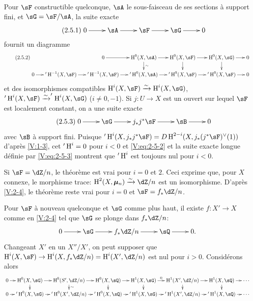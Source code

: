 Pour $\sF$ constructible quelconque, $\sA$ le sous-faisceau de ses sections \`a 
support fini, et $\sG=\sF/\sA$, la suite exacte 
\begin{equation*}\label{V:eq:2-5-1}\tag{2.5.1}
\xymatrix{
  0 \ar[r] 
    & \sA \ar[r] 
    & \sF \ar[r] 
    & \sG \ar[r] 
    & 0 
}
\end{equation*}
fournit un diagramme 
\begin{equation*}\tag{2.5.2}\label{V:eq:2-5-2}
\xymatrix@=.5cm{
  & & 0 \ar[r] 
    & \h^0(X,\sA) \ar[r] \ar[d]^-\sim 
    & \h^0(X,\sF) \ar[r] \ar[d] 
    & \h^0(X,\sG) \ar[r] \ar[d] 
    & 0 \\
  0 \ar[r] 
  & '\h^{-1}(X,\sF) \ar[r] 
  & '\h^{-1}(X,\sF) \ar[r] 
  & '\h^0(X,\sA) \ar[r] 
  & '\h^0(X,\sF) \ar[r] 
  & '\h^0(X,\sF) \ar[r] 
  & 0 
}
\end{equation*}
et des isomorphismes compatibles $\h^i(X,\sF)\iso \h^i(X,\sG)$, 
$'\h^i(X,\sF) \iso '\h^i(X,\sG)$ ($i\ne 0,-1$). Si $j:U\to X$ est un ouvert sur 
lequel $\sF$ est localement constant, on a une suite exacte 
\begin{equation*}\tag{2.5.3}\label{V:eq:2-5-3}
\xymatrix{
  0 \ar[r] 
    & \sG \ar[r] 
    & j_\ast j^\ast \sF \ar[r] 
    & \sB \ar[r] 
    & 0
}
\end{equation*}
avec $\sB$ \`a support fini. Puisque 
$'\h^i(X,j_\ast j^\ast\sF) = D \h^{2-i} (X,j_\ast(j^\ast\sF)^\vee(1))$ 
d'apr\`es \ref{V:1-3}, cet $'\operatorname{H}^i=0$ pour $i<0$ et \eqref{V:eq:2-5-2} et la 
suite exacte longue d\'efinie par \eqref{V:eq:2-5-3} montrent que $'\operatorname{H}^i$ est 
toujours nul pour $i<0$. 

Si $\sF=\dZ/n$, le th\'eor\`eme est vrai pour $i=0$ et $2$. Ceci exprime que, 
pour $X$ connexe, le morphisme trace: $\h^2(X,\dmu_n) \iso \dZ/n$ est un 
isomorphisme. D'apr\`es \ref{V:2-4}, le th\'eor\`eme reste vrai pour $i=0$ et 
$\sF=f_\ast\dZ/n$. 

Pour $\sF$ \`a nouveau quelconque et $\sG$ comme plus haut, il existe 
$f:X'\to X$ comme en \ref{V:2-4} tel que $\sG$ se plonge dans $f_\ast\dZ/n$:
\[\xymatrix{
  0 \ar[r] 
    & \sG \ar[r] 
    & f_\ast\dZ/n \ar[r] 
    & \sQ \ar[r] 
    & 0 \text{.}
}\]
Changeant $X'$ en un $X''/X'$, on peut supposer que 
$\h^i(X,\sF) \to \h^i(X,f_\ast\dZ/n) = \h^i(X',\dZ/n)$ est nul pour $i>0$. 
Consid\'erons alors 
\[\xymatrix@=.3cm{
  0 \ar[r] 
    & \h^0(X,\sG) \ar[r] \ar[d] 
    & \h^0(S',\dZ/n) \ar[r] \ar[d]^-\sim 
    & \h^0(X,\sQ) \ar[r] \ar[d] 
    & \h^1(X,\sG) \ar[r]^-0 \ar[d] 
    & \h^1(X',\dZ/n) \ar[r] \ar[d] 
    & \h^1(X,\sQ) \ar[r] \ar[d] 
    & \cdots \\
  0 \ar[r] 
    & '\h^0(X,\sG) \ar[r] 
    & '\h^0(X',\dZ/n) \ar[r] 
    & '\h^0(X,\sQ) \ar[r] 
    & '\h^1(X,\sG) \ar[r] 
    & '\h^1(X',\dZ/n) \ar[r] 
    & '\h^1(X,\sQ) \ar[r] 
    & \cdots
}\]

